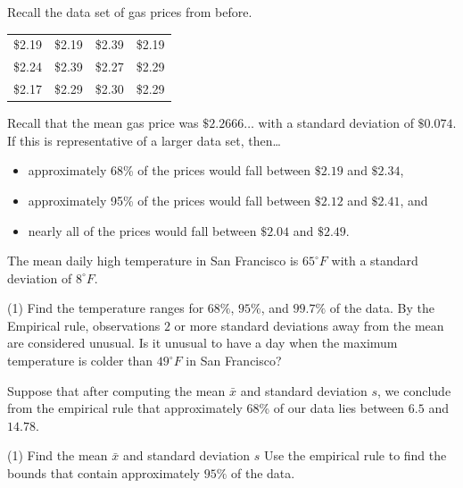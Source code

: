 \documentclass[../mathNotesPreamble]{subfiles}
\begin{document}
  \begin{ex*}
    Recall the data set of gas prices from before.     
  \begin{center}
    \begin{tabular}{@{}*{4}{c}@{}}\toprule
      \$2.19 & \$2.19 & \$2.39 & \$2.19 \\
      \$2.24 & \$2.39 & \$2.27 & \$2.29 \\
      \$2.17 & \$2.29 & \$2.30 & \$2.29 \\\bottomrule
    \end{tabular}
  \end{center}
  \end{ex*}
  \noindent
  Recall that the mean gas price was $\$2.2666\dots$ with a standard deviation of $\$0.074$. If this is representative of a larger data set, then\dots
  \begin{itemize}
    \item approximately 68\% of the prices would fall between $\$2.19$ and $\$2.34$,
    \item approximately 95\% of the prices would fall between $\$2.12$ and $\$2.41$, and
    \item nearly all of the prices would fall between $\$2.04$ and $\$2.49$.
  \end{itemize}
  \pagebreak
  
  \begin{ex*}
    The mean daily high temperature in San Francisco is $65^\circ F$ with a standard deviation of $8^\circ F$. 
    \begin{tasks}[after-item-skip=\stretch{1}, label=\textbullet](1)
      \task Find the temperature ranges for $68\%$, $95\%$, and $99.7\%$ of the data.
      \task By the Empirical rule, observations $2$ or more standard deviations away from the mean are considered unusual. Is it unusual to have a day when the maximum temperature is colder than $49^\circ F$ in San Francisco?
    \end{tasks}
  \end{ex*}
  \pagebreak

  \begin{ex*}
    Suppose that after computing the mean $\bar{x}$ and standard deviation $s$, we conclude from the empirical rule that approximately 68\% of our data lies between $6.5$ and $14.78$.
    \begin{tasks}[after-item-skip=\stretch{1}, label=\textbullet](1)
      \task Find the mean $\bar{x}$ and standard deviation $s$
      \task Use the empirical rule to find the bounds that contain approximately $95\%$ of the data.
    \end{tasks}
  \end{ex*}
  \pagebreak
\end{document}
